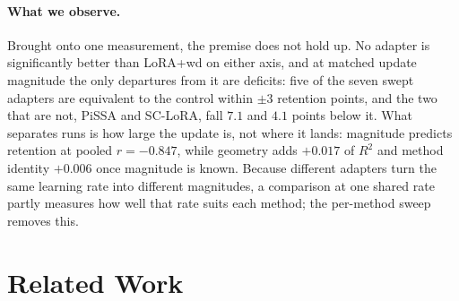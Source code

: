 \documentclass[11pt]{article}
\begin{document}
\paragraph{What we observe.} Brought onto one measurement, the premise does
not hold up. No adapter is significantly better than LoRA{+}wd on either
axis, and at matched update magnitude the only departures from it are
deficits: five of the seven swept adapters are equivalent to the control
within $\pm3$ retention points, and the two that are not, PiSSA and
SC-LoRA, fall $7.1$ and $4.1$ points below it. What separates runs is how
large the update is, not where it lands: magnitude predicts retention at
pooled $r=-0.847$, while geometry adds $+0.017$ of $R^2$ and method
identity $+0.006$ once magnitude is known. Because different adapters turn
the same learning rate into different magnitudes, a comparison at one
shared rate partly measures how well that rate suits each method; the
per-method sweep removes this.

\section{Related Work}\label{sec:related}
\end{document}
